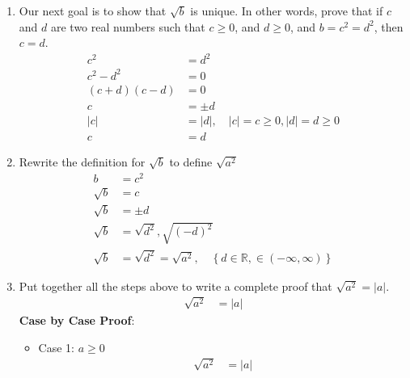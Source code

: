 \documentclass{article}
\begin{document}
\begin{enumerate}[label = \textbf{\alph*)}]
\begin{itemize}
	      \end{itemize}
	\item Our next goal is to show that $ \sqrt{b} $ is unique. In other words, prove that if $ c $ and $ d $ are two real numbers such that $ c \geq 0 $, and $ d \geq 0 $, and $ b = c^2 = d^2 $, then $ c = d $.
	      \begin{align*}
		      c^2            & = d^2                                       \\
		      c^2 - d^2      & = 0                                         \\
		      (c + d)(c - d) & = 0                                         \\
		      c              & = \pm d                                     \\
		      |c|            & = |d|, \quad |c| = c \geq 0, |d| = d \geq 0 \\
		      c              & = d
	      \end{align*}
	\item Rewrite the definition for $ \sqrt{b} $ to define $ \sqrt{ a^2 } $
	      \begin{align*}
		      b        & = c^2                                                                                         \\
		      \sqrt{b} & = c                                                                                           \\
		      \sqrt{b} & = \pm d                                                                                       \\
		      \sqrt{b} & = \sqrt{ d^2 }, \sqrt{ (-d)^2 }                                                               \\
		      \sqrt{b} & = \sqrt{ d^2 } = \sqrt{ a^2 }, \quad \left\{ d \in \mathbb{R}, \in (-\infty, \infty) \right\}
	      \end{align*}
	\item Put together all the steps above to write a complete proof that $ \sqrt{ a^2 } = |a| $.
	      \begin{align*}
		      \sqrt{ a^2 } & = |a|
	      \end{align*}
	      \textbf{Case by Case Proof}:
	      \begin{itemize}
		      \item Case 1: $ a \geq 0 $
		            \begin{align*}
			            \sqrt{ a^2 } & = |a|                                 \\

\end{align*}
\end{itemize}
\end{enumerate}
\end{document}
